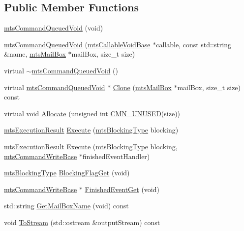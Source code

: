 \subsection*{Public Member Functions}
\begin{DoxyCompactItemize}
\item 
\hyperlink{classmts_command_queued_void_ae4b533b50c449cae2635e9a03f311e48}{mts\-Command\-Queued\-Void} (void)
\item 
\hyperlink{classmts_command_queued_void_affae2e472d01c8042d73af7e8b625f09}{mts\-Command\-Queued\-Void} (\hyperlink{classmts_callable_void_base}{mts\-Callable\-Void\-Base} $\ast$callable, const std\-::string \&name, \hyperlink{classmts_mail_box}{mts\-Mail\-Box} $\ast$mail\-Box, size\-\_\-t size)
\item 
virtual \hyperlink{classmts_command_queued_void_ae7df3dadda5dfe5f8451df3f876e2bed}{$\sim$mts\-Command\-Queued\-Void} ()
\item 
virtual \hyperlink{classmts_command_queued_void}{mts\-Command\-Queued\-Void} $\ast$ \hyperlink{classmts_command_queued_void_ac05543187c0ece13fee129e78a3db5c3}{Clone} (\hyperlink{classmts_mail_box}{mts\-Mail\-Box} $\ast$mail\-Box, size\-\_\-t size) const 
\item 
virtual void \hyperlink{classmts_command_queued_void_a78454afe56333b6e5bb2e9c07510bc67}{Allocate} (unsigned int \hyperlink{cmn_portability_8h_a021894e2626935fa2305434b1e893ff6}{C\-M\-N\-\_\-\-U\-N\-U\-S\-E\-D}(size))
\item 
\hyperlink{classmts_execution_result}{mts\-Execution\-Result} \hyperlink{classmts_command_queued_void_ac3d3b8518799820922ccfa207ecd7ab1}{Execute} (\hyperlink{mts_forward_declarations_8h_ad7426ccb6c883bc780d0ee197dddcbe7}{mts\-Blocking\-Type} blocking)
\item 
\hyperlink{classmts_execution_result}{mts\-Execution\-Result} \hyperlink{classmts_command_queued_void_a116aafff54b04cf64c0cc5613b3af268}{Execute} (\hyperlink{mts_forward_declarations_8h_ad7426ccb6c883bc780d0ee197dddcbe7}{mts\-Blocking\-Type} blocking, \hyperlink{classmts_command_write_base}{mts\-Command\-Write\-Base} $\ast$finished\-Event\-Handler)
\item 
\hyperlink{mts_forward_declarations_8h_ad7426ccb6c883bc780d0ee197dddcbe7}{mts\-Blocking\-Type} \hyperlink{classmts_command_queued_void_a163d660aee89584416b7d30fb171a388}{Blocking\-Flag\-Get} (void)
\item 
\hyperlink{classmts_command_write_base}{mts\-Command\-Write\-Base} $\ast$ \hyperlink{classmts_command_queued_void_ae1854cdc3b5616be70f882958a0d05de}{Finished\-Event\-Get} (void)
\item 
std\-::string \hyperlink{classmts_command_queued_void_af4cee03f759bbaece836a573fb1772c2}{Get\-Mail\-Box\-Name} (void) const 
\item 
void \hyperlink{classmts_command_queued_void_ab5d265a6803f5d3c6d540bf3c4c2fd36}{To\-Stream} (std\-::ostream \&output\-Stream) const 
\end{DoxyCompactItemize}
